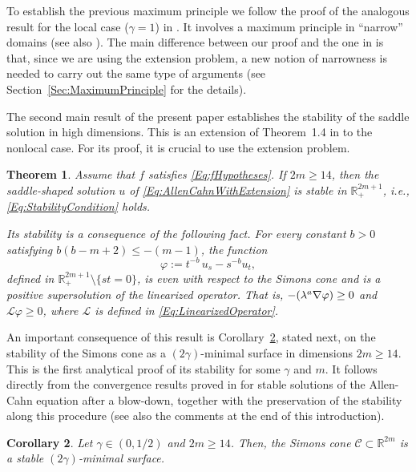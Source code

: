 \documentclass[12pt,reqno]{amsart}
\newtheorem{theorem}{Theorem}[section]
\newtheorem{corollary}[theorem]{Corollary}
\theoremstyle{definition}
\theoremstyle{remark}
\newcommand{\con}[1]{\mathbb{#1}}
\newcommand{\R}{\con{R}} %
\newcommand{\ccal}{\mathscr{C}}
\newcommand{\s}{\gamma}
\let\div\relax
\DeclareMathOperator{\div}{div}
\numberwithin{equation}{section}
\begin{document}
To establish the previous maximum principle we follow the proof of the analogous result for the local case ($\s = 1$) in \cite{Cabre-Saddle}. It involves a maximum principle in ``narrow'' domains (see also \cite{Cabre-Topics,BerestyckiNirembergVaradhan}). The main difference between our proof and the one in \cite{Cabre-Saddle} is that, since we are using the extension problem, a new notion of narrowness is needed to carry out the same type of arguments (see Section~\ref{Sec:MaximumPrinciple} for the details).


The second main result of the present paper establishes the stability of the saddle solution in high dimensions. This is an extension of Theorem~1.4 in \cite{Cabre-Saddle} to the nonlocal case. For its proof, it is crucial to use the extension problem.

\begin{theorem}
\label{Thm:Stability}
Assume that $f$ satisfies \eqref{Eq:fHypotheses}. If $2m\geq 14$, then the saddle-shaped solution $u$ of \eqref{Eq:AllenCahnWithExtension} is stable in $\R^{2m+1}_+$, i.e., \eqref{Eq:StabilityCondition} holds. 

Its stability is a consequence of the following fact. For every constant $b>0$ satisfying $b(b-m+2)\leq -(m-1)$, the function
$$
\varphi := t^{-b} \, u_s - s^{-b} u_t, 
$$
defined in $\R^{2m+1}_+\setminus\{st=0\}$, is even with respect to the Simons cone and is a positive supersolution of the linearized operator. That is, $-\div(\lambda^a \nabla \varphi) \geq 0$ and $\mathscr{L} \varphi \geq 0$, where $\mathscr{L}$ is defined in \eqref{Eq:LinearizedOperator}.
\end{theorem}

An important consequence of this result is Corollary~\ref{Cor:SimonsConeStableDim14}, stated next, on the stability of the Simons cone as a $(2\s)$-minimal surface in dimensions $2m\geq 14$. This is the first analytical proof of its stability for some $\s$ and $m$. It follows directly from the convergence results proved in \cite{CabreCintiSerra-Stable} for stable solutions of the Allen-Cahn equation after a blow-down, together with the preservation of the stability along this procedure (see also the comments at the end of this introduction).

\begin{corollary}
\label{Cor:SimonsConeStableDim14}
Let $\s \in (0,1/2)$ and $2m\geq 14$. Then, the Simons cone $\ccal \subset \R^{2m}$ is a stable $(2\s)$-minimal surface.
\end{corollary}
\end{document}
